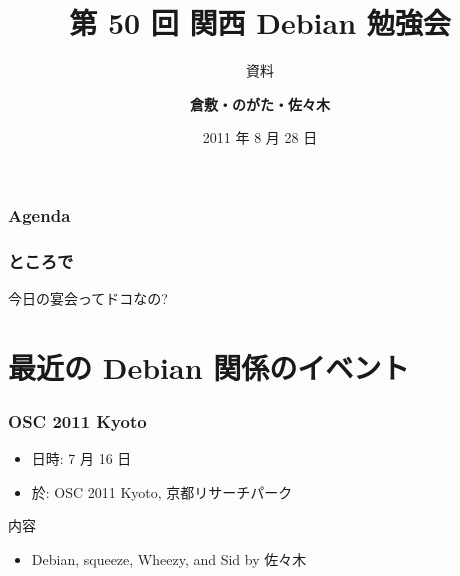 \documentclass[cjk,dvipdfmx,12pt,%
hyperref={bookmarks=true,bookmarksnumbered=true,bookmarksopen=false,%
colorlinks=false,%
pdftitle={第 50 回 関西 Debian 勉強会},%
pdfauthor={倉敷・のがた・佐々木},%
pdfsubject={資料},%
}]{beamer}
\title{第 50 回 関西 Debian 勉強会}
\subtitle{{\scriptsize 資料}}
\author[倉敷 悟]{{\large\bf 倉敷・のがた・佐々木}}
\institute[Debian JP]{{\normalsize\tt 関西 Debian 勉強会}}
\date{{\small 2011 年 8 月 28 日}}
\begin{document}
\settitleslide
\begin{frame}
\titlepage
\end{frame}
\setdefaultslide

\begin{frame}[fragile]
\frametitle{Agenda}
\tableofcontents
\end{frame}

\begin{frame}[fragile]
\frametitle{ところで}

今日の宴会ってドコなの?

\end{frame}

\section{最近の Debian 関係のイベント}


\begin{frame}[fragile]
\frametitle{OSC 2011 Kyoto}

\begin{itemize}
\item 日時: 7 月 16 日
\item 於: OSC 2011 Kyoto, 京都リサーチパーク
\end{itemize}

\begin{block}{内容}
  \begin{itemize}
  \item Debian, squeeze, Wheezy, and Sid by 佐々木
  \end{itemize}
\end{block}
\end{frame}
\end{document}
